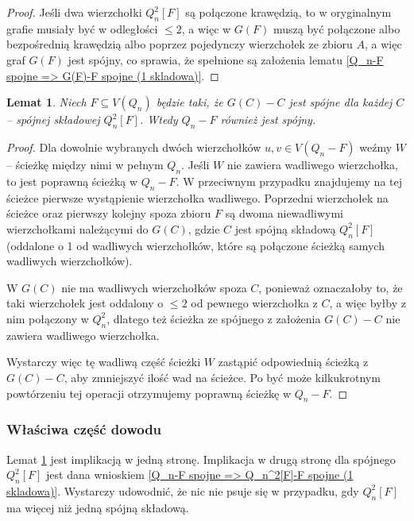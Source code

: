 \documentclass{pracamgr}
\newtheorem{lemma}[theorem]{Lemat}
\begin{document}
    \begin{proof}
     Jeśli dwa wierzchołki $Q_n^2[F]$ są połączone krawędzią, to w oryginalnym grafie musiały być w odległości $\le 2$, a więc w $G(F)$ muszą być połączone
     albo bezpośrednią krawędzią albo poprzez pojedynczy wierzchołek ze zbioru $A$, a więc graf $G(F)$ jest spójny, co sprawia,
     że spełnione są założenia lematu \ref{Q_n-F spojne => G(F)-F spojne (1 skladowa)}.
    \end{proof}
    \begin{lemma}\label{Q_n^2[F]-F spojne => Q_n-F spojne}
     Niech $F\subseteq V(Q_n)$ będzie taki, że $G(C)-C$ jest spójne dla każdej $C$ -- spójnej składowej $Q_n^2[F]$. Wtedy $Q_n-F$ również jest spójny.
    \end{lemma}
    \begin{proof}
     Dla dowolnie wybranych dwóch wierzchołków $u,v\in V(Q_n-F)$ weźmy $W$ -- ścieżkę między nimi w pełnym $Q_n$. Jeśli $W$ nie zawiera wadliwego wierzchołka,
     to jest poprawną ścieżką w $Q_n-F$. W przeciwnym przypadku znajdujemy na tej ścieżce pierwsze wystąpienie wierzchołka wadliwego.
     Poprzedni wierzchołek na ścieżce oraz pierwszy kolejny spoza zbioru $F$ są dwoma niewadliwymi wierzchołkami należącymi do $G(C)$, gdzie $C$
     jest spójną składową $Q_n^2[F]$ (oddalone o 1 od wadliwych wierzchołków, które są połączone ścieżką samych wadliwych wierzchołków).
     
     W $G(C)$ nie ma wadliwych wierzchołków spoza $C$, ponieważ oznaczałoby to, że taki wierzchołek jest oddalony o $\le 2$ od pewnego wierzchołka z $C$,
     a więc byłby z nim połączony w $Q_n^2$, dlatego też ścieżka ze spójnego z założenia $G(C)-C$ nie zawiera wadliwego wierzchołka.
     
     Wystarczy więc tę wadliwą część ścieżki $W$ zastąpić odpowiednią ścieżką z $G(C)-C$, aby zmniejszyć ilość wad na ścieżce.
     Po być może kilkukrotnym powtórzeniu tej operacji otrzymujemy poprawną ścieżkę w $Q_n-F$.
    \end{proof}\newpage
    \subsubsection{Właściwa część dowodu}
     Lemat \ref{Q_n^2[F]-F spojne => Q_n-F spojne} jest implikacją w jedną stronę.
     Implikacja w drugą stronę dla spójnego $Q_n^2[F]$ jest dana wnioskiem \ref{Q_n-F spojne => Q_n^2[F]-F spojne (1 skladowa)}.
     Wystarczy udowodnić, że nic nie psuje się w przypadku, gdy $Q_n^2[F]$ ma więcej niż jedną spójną składową.
     
\end{document}
